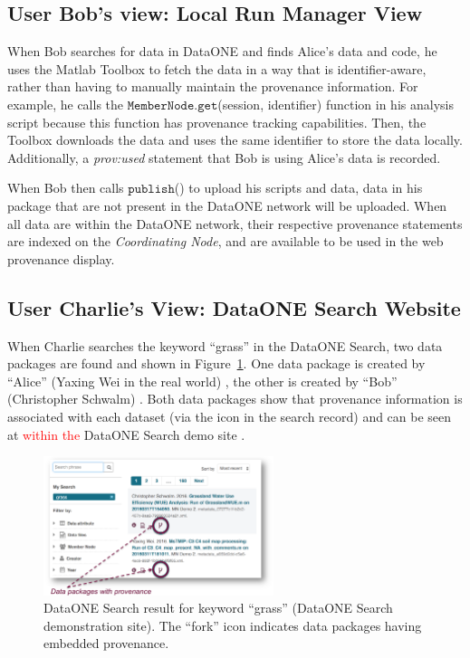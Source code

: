 \documentclass[a4paper]{llncs}
\newcommand{\mytt}[1]{\ensuremath{\mathtt{#1}}}
\begin{document}
\subsection{User Bob's view: Local Run Manager View}

When Bob searches for data in DataONE and finds Alice's data and code, he uses the Matlab Toolbox to fetch the data in a way that is identifier-aware, rather than having to manually maintain the provenance information. For example, he calls the \mytt{MemberNode.get}(session, identifier) function in his analysis script because this function has provenance tracking capabilities. Then, the Toolbox downloads the data and uses the same identifier to store the data locally. Additionally, a \emph{prov:used} statement that Bob is using Alice's data is recorded.

When Bob then calls \mytt{publish}() to upload his scripts and data, data in his package that are not present in the DataONE network will be uploaded.  When all data are within the DataONE network, their respective provenance statements are indexed on the \emph{Coordinating Node}, and are available to be used in the web provenance display.



\subsection{User Charlie's View: DataONE Search Website}

When Charlie searches the keyword ``grass'' in the DataONE Search, two data packages are found and shown in Figure~\ref{fig1}. One data package is created by ``Alice'' (Yaxing Wei in the real world) \cite{yaxing}, the other is created by ``Bob'' (Christopher Schwalm) \cite{christopher}. Both data packages show that provenance information is associated with each dataset (via the icon in the search record) and can be seen at \textcolor{red}{within the} DataONE Search demo site \cite{dataone-demo}.

\begin{figure}[t]
\centering   
\includegraphics[width=0.6\textwidth]{figs/ab-crop}
\caption{DataONE Search result for keyword  ``grass'' (DataONE Search demonstration site). The ``fork'' icon indicates data packages having embedded provenance.}
\label{fig1}
\end{figure}
\end{document}
